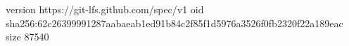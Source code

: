 version https://git-lfs.github.com/spec/v1
oid sha256:62c26399991287aabaeab1ed91b84c2f85f1d5976a3526f0fb2320f22a189eac
size 87540

